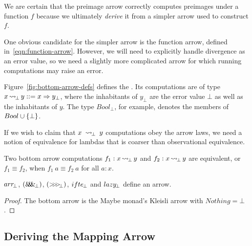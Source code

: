 \documentclass[preprint]{sigplanconf}
\newcommand{\arrow}{\rightsquigarrow}
\newcommand{\arrowarr}{\ensuremath{arr}}
\newcommand{\arrowcomp}{\ensuremath{{>}\mspace{-6mu}{>}\mspace{-6mu}{>}}}
\newcommand{\arrowpair}{\ensuremath{\mathit{\&\mspace{-7.5mu}\&\mspace{-7.5mu}\&}}}
\newcommand{\arrowif}{\ensuremath{ifte}}
\newcommand{\arrowlazy}{\ensuremath{lazy}}
\DeclareMathOperator{\botto}{\arrow_{\mspace{-3mu}\bot}}
\newcommand{\arrbot}{\arrowarr_{\mspace{-3mu}\bot}}
\newcommand{\compbot}{\arrowcomp_{\mspace{-5mu}\bot}}
\newcommand{\pairbot}{\arrowpair_{\mspace{-3mu}\bot}}
\newcommand{\ifbot}{\arrowif_{\mspace{-2mu}\bot}}
\newcommand{\lazybot}{\arrowlazy_{\mspace{-2mu}\bot}}
\begin{document}
We are certain that the preimage arrow correctly computes preimages under a function $f$ because we ultimately \emph{derive} it from a simpler arrow used to construct $f$.

One obvious candidate for the simpler arrow is the function arrow, defined in~\eqref{eqn:function-arrow}.
However, we will need to explicitly handle divergence as an error value, so we need a slightly more complicated arrow for which running computations may raise an error.

Figure~\ref{fig:bottom-arrow-defs} defines the .
Its computations are of type $x \botto y ::= x \tto y_\bot$, where the inhabitants of $y_\bot$ are the error value $\bot$ as well as the inhabitants of $y$. The type $Bool_\bot$, for example, denotes the members of $Bool \cup \{{\bot}\}$.

If we wish to claim that $x~\botto~y$ computations obey the arrow laws, we need a notion of equivalence for lambdas that is coarser than observational equivalence.
\begin{definition}
Two bottom arrow computations $f_1 : x \botto y$ and $f_2 : x \botto y$ are equivalent, or $f_1 \equiv f_2$, when $f_1~a \equiv f_2~a$ for all $a : x$.
\end{definition}

\begin{theorem}
$\arrbot$, $(\pairbot)$, $(\compbot)$, $\ifbot$ and $\lazybot$ define an arrow.
\end{theorem}
\begin{proof}
The bottom arrow is the Maybe monad's Kleisli arrow with $Nothing = \bot$.
\end{proof}

\subsection{Deriving the Mapping Arrow}
\end{document}
